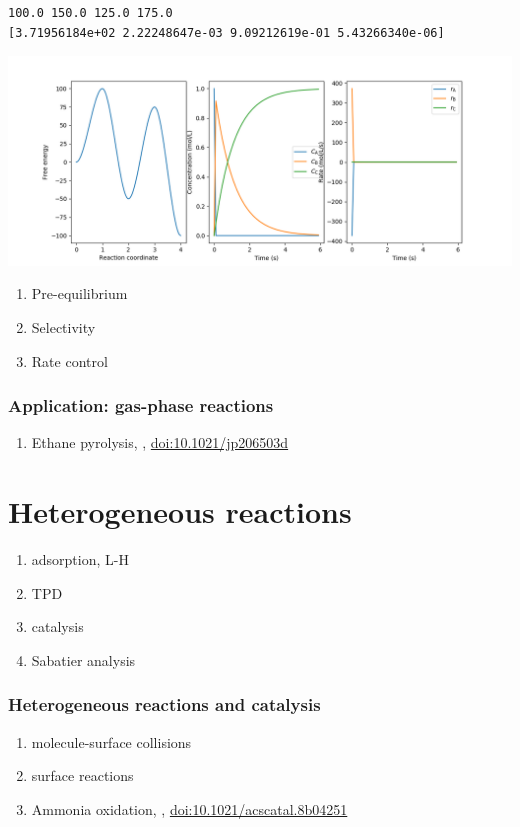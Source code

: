 \documentclass[11pt]{article}
\begin{document}
\begin{verbatim}
100.0 150.0 125.0 175.0
[3.71956184e+02 2.22248647e-03 9.09212619e-01 5.43266340e-06]
\end{verbatim}


\begin{center}
\includegraphics[width=.9\linewidth]{./Images/ABC-rxn.png}
\end{center}

\begin{enumerate}
\item Pre-equilibrium
\item Selectivity
\item Rate control
\end{enumerate}
\subsubsection{Application: gas-phase reactions}
\label{sec:org1dbb5b5}
\begin{enumerate}
\item Ethane pyrolysis, , \href{https://pubs.acs.org/doi/10.1021/jp206503d}{doi:10.1021/jp206503d}
\end{enumerate}

\section{Heterogeneous reactions}
\label{sec:org7a495a4}
\begin{enumerate}
\item adsorption, L-H
\item TPD
\item catalysis
\item Sabatier analysis
\end{enumerate}
\subsubsection{Heterogeneous reactions and catalysis}
\label{sec:org74bccd1}
\begin{enumerate}
\item molecule-surface collisions
\item surface reactions
\item Ammonia oxidation, , \href{http://pubs.acs.org/doi/10.1021/acscatal.8b04251}{doi:10.1021/acscatal.8b04251}
\end{enumerate}
\end{document}
